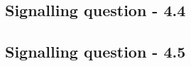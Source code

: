 \documentclass[sn-mathphys,Numbered]{sn-jnl}%
\begin{document}
%
%
%
\subsection*{Signalling question - 4.4 }
%

%
%
%
\subsection*{Signalling question - 4.5 }
%

%
%
%

\end{document}
